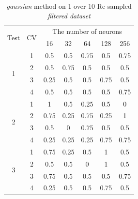 \documentclass[draft,dvipsnames]{drexel-thesis}
\begin{document}
\begin{thesis}
\begin{table}[!t]
\centering
\caption{{\em gaussian} method on 1 over 10 Re-sampled {\em filtered dataset}}
\label{tbl:gaussian_1_10}
\begin{tabular}{|c|c|c|c|c|c|c|}
\hline
\multirow{2}{*}{Test} & \multirow{2}{*}{CV} & \multicolumn{5}{c|}{The number of neurons}                               \\ \cline{3-7}
                      &                     & 16           & 32           & 64           & 128          & 256          \\ \hline
\multirow{4}{*}{1}    & 1                   & 0.5          & 0.5          & 0.75         & 0.5          & 0.75         \\ \cline{2-7}
                      & 2                   & 0.5          & 0.75         & 0.5          & 0.5          & 0.5          \\ \cline{2-7}
                      & 3                   & 0.25         & 0.5          & 0.5          & 0.75         & 0.5          \\ \cline{2-7}
                      & 4                   & 0.5          & 0.5          & 0.5          & 0.5          & 0.75         \\ \hline
\multirow{4}{*}{2}    & 1                   & 1            & 0.5          & 0.25         & 0.5          & 0            \\ \cline{2-7}
                      & 2                   & 0.75         & 0.25         & 0.75         & 0.25         & 1            \\ \cline{2-7}
                      & 3                   & 0.5          & 0            & 0.75         & 0.5          & 0.5          \\ \cline{2-7}
                      & 4                   & 0.25         & 0.25         & 0.25         & 0.75         & 0.75         \\ \hline
\multirow{4}{*}{3}    & 1                   & 0.75         & 0.25         & 0.5          & 1            & 0.5          \\ \cline{2-7}
                      & 2                   & 0.5          & 0.5          & 0            & 1            & 0.5          \\ \cline{2-7}
                      & 3                   & 0.75         & 0.5          & 0.5          & 0.5          & 0.75         \\ \cline{2-7}
                      & 4                   & 0.25         & 0.5          & 0.5          & 0.75         & 0.5          \\ \hline

\end{tabular}
\end{table}
\end{thesis}
\end{document}
